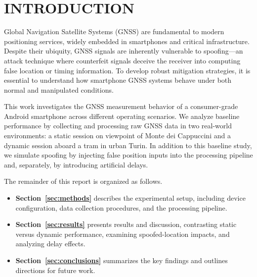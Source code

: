 
\section{INTRODUCTION} \label{sec:introduction}

    Global Navigation Satellite Systems (GNSS) are fundamental to modern positioning services, widely embedded in smartphones and critical infrastructure. 
    Despite their ubiquity, GNSS signals are inherently vulnerable to spoofing—an attack technique where counterfeit signals deceive the receiver into computing false location or timing information. 
    To develop robust mitigation strategies, it is essential to understand how smartphone GNSS systems behave under both normal and manipulated conditions.

    \noindent This work investigates the GNSS measurement behavior of a consumer-grade Android smartphone across different operating scenarios. 
    We analyze baseline performance by collecting and processing raw GNSS data in two real-world environments: a static session on viewpoint of Monte dei Cappuccini and a dynamic session aboard a tram in urban Turin. 
    In addition to this baseline study, we simulate spoofing by injecting false position inputs into the processing pipeline and, separately, by introducing artificial delays.

    \noindent The remainder of this report is organized as follows.
    
    \begin{itemize}
        \item \textbf{Section~\ref{sec:methods}} describes the experimental setup, including device configuration, data collection procedures, and the processing pipeline.
        \item \textbf{Section~\ref{sec:results}} presents results and discussion, contrasting static versus dynamic performance, examining spoofed-location impacts, and analyzing delay effects.
        \item \textbf{Section~\ref{sec:conclusions}} summarizes the key findings and outlines directions for future work.
    \end{itemize}
